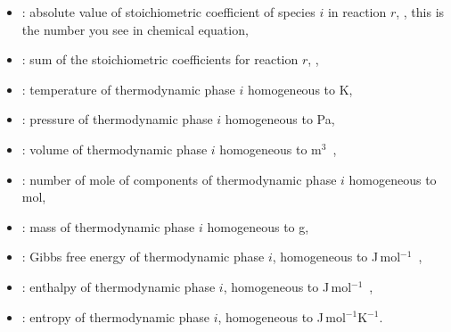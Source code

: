 \begin{itemize}
\item \scoefabs[i,r]: absolute value of stoichiometric coefficient of species $i$ in reaction $r$, \nounit, this is the number
        you see in chemical equation,
\item \sumscoef[r]: sum of the stoichiometric coefficients for reaction $r$, \nounit,
\item \Temp[i]: temperature of thermodynamic  phase $i$ homogeneous to \unit{K}, 
\item \Press[i]: pressure of thermodynamic  phase $i$ homogeneous to \unit{Pa}, 
\item \Vol[i]: volume of thermodynamic  phase $i$ homogeneous to \unit{m$^3$}, 
\item \Mol[i]: number of mole of components of thermodynamic  phase $i$ homogeneous to \unit{mol}, 
\item \Mass[i]: mass of thermodynamic  phase $i$ homogeneous to \unit{g}, 
\item \Gibbs[i]: Gibbs free energy of thermodynamic phase $i$, homogeneous to \unit{J\,mol$^{-1}$},
\item \Enth[i]: enthalpy of thermodynamic phase $i$, homogeneous to \unit{J\,mol$^{-1}$},
\item \Entr[i]: entropy of thermodynamic phase $i$, homogeneous to \unit{J\,mol$^{-1}$K$^{-1}$}.
\end{itemize}
%
